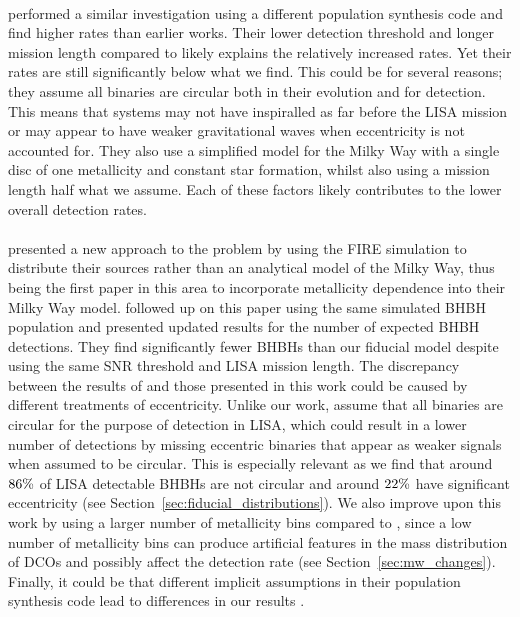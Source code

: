 \paragraph{\citet{Liu+2014}} performed a similar investigation using a different population synthesis code and find higher rates than earlier works. Their lower detection threshold and longer mission length compared to \citet{Belczynski+2010} likely explains the relatively increased rates. Yet their rates are still significantly below what we find. This could be for several reasons; they assume all binaries are circular both in their evolution and for detection. This means that systems may not have inspiralled as far before the LISA mission or may appear to have weaker gravitational waves when eccentricity is not accounted for. They also use a simplified model for the Milky Way with a single disc of one metallicity and constant star formation, whilst also using a mission length half what we assume. Each of these factors likely contributes to the lower overall detection rates.

\paragraph{\citet{Lamberts+2018}} presented a new approach to the problem by using the FIRE simulation \citep{Hopkins+2014} to distribute their sources rather than an analytical model of the Milky Way, thus being the first paper in this area to incorporate metallicity dependence into their Milky Way model. \citet{Sesana+2020} followed up on this paper using the same simulated BHBH population and presented updated results for the number of expected BHBH detections. They find significantly fewer BHBHs than our fiducial model despite using the same SNR threshold and LISA mission length.
%
The discrepancy between the results of \citet{Sesana+2020} and those presented in this work could be caused by different treatments of eccentricity. Unlike our work, \citet{Sesana+2020} assume that all binaries are circular for the purpose of detection in LISA, which could result in a lower number of detections by missing eccentric binaries that appear as weaker signals when assumed to be circular. This is especially relevant as we find that around $86\%{}$ of LISA detectable BHBHs are not circular and around $22\%{}$ have significant eccentricity (see Section~\ref{sec:fiducial_distributions}). We also improve upon this work by using a larger number of metallicity bins compared to \citet{Sesana+2020}, since a low number of metallicity bins can produce artificial features in the mass distribution of DCOs and possibly affect the detection rate (see Section~\ref{sec:mw_changes}). Finally, it could be that different implicit assumptions in their population synthesis code lead to differences in our results \citep{Toonen+2014}.


